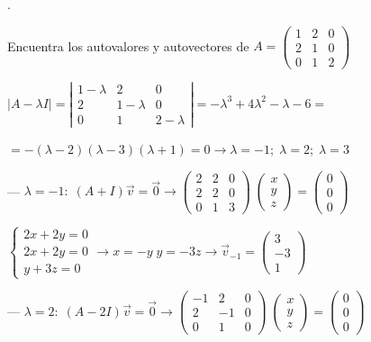 \begin{miejercicio}.

Encuentra los autovalores y autovectores de $A=\left( \begin{matrix} 1&2&0\\2&1&0\\0&1&2 \end{matrix} \right)$	
\end{miejercicio}


	$|A-\lambda I|=\left| \begin{matrix} 1-\lambda &2&0 \\2&1-\lambda &0 \\0&1&2-\lambda \end{matrix} \right|=-\lambda^3+4\lambda^2-\lambda -6=$
	
\noindent $= -(\lambda-2)(\lambda-3)(\lambda+1)=0 \to \lambda=-1; \; \lambda=2;\; \lambda=3$

\noindent --- $\lambda=-1:\; (A+I)\vec v =\vec 0 \to \left( \begin{matrix} 2&2&0\\2&2&0\\0&1&3 \end{matrix} \right) \; \left( \begin{matrix} x\\y\\z \end{matrix} \right)=\left( \begin{matrix} 0\\0\\0 \end{matrix} \right)$

\noindent $\begin{cases} 2x+2y=0\\2x+2y=0\\y+3z=0 \end{cases} \to x=-y \; y=-3z \to \vec v_{-1}= \left( \begin{matrix} 3\\-3\\1 \end{matrix} \right)$


\noindent --- $\lambda=2:\; (A-2I)\vec v =\vec 0 \to \left( \begin{matrix} -1&2&0\\2&-1&0\\0&1&0 \end{matrix} \right) \; \left( \begin{matrix} x\\y\\z \end{matrix} \right)=\left( \begin{matrix} 0\\0\\0 \end{matrix} \right)$

